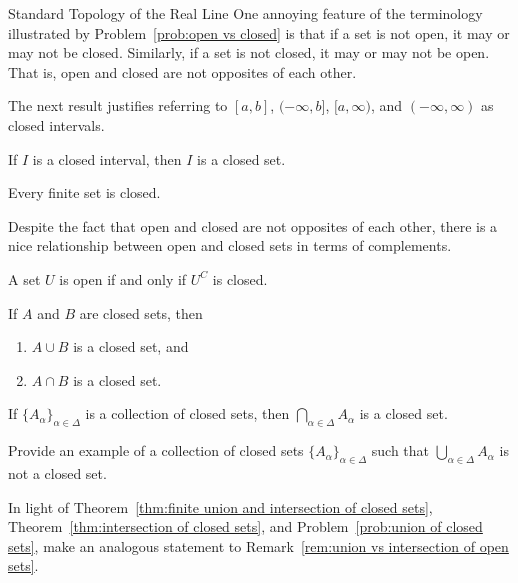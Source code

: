 \begin{section}{Standard Topology of the Real Line}
One annoying feature of the terminology illustrated by Problem~\ref{prob:open vs closed} is that if a set is not open, it may or may not be closed.  Similarly, if a set is not closed, it may or may not be open.  That is, open and closed are not opposites of each other.

The next result justifies referring to $[a,b]$, $(-\infty,b]$, $[a,\infty)$, and $(-\infty,\infty)$ as closed intervals.

\begin{theorem}
If $I$ is a closed interval, then $I$ is a closed set.
\end{theorem}

\begin{theorem}
Every finite set is closed.
\end{theorem}

Despite the fact that open and closed are not opposites of each other, there is a nice relationship between open and closed sets in terms of complements.

\begin{theorem}
A set $U$ is open if and only if $U^C$ is closed.
\end{theorem}

\begin{theorem}\label{thm:finite union and intersection of closed sets}
If $A$ and $B$ are closed sets, then 
\begin{enumerate}[label=\textrm{(\alph*)}]
\item $A\cup B$ is a closed set, and
\item $A\cap B$ is a closed set.
\end{enumerate}
\end{theorem}

\begin{theorem}\label{thm:intersection of closed sets}
If $\{A_{\alpha}\}_{\alpha\in\Delta}$ is a collection of closed sets, then $\bigcap_{\alpha\in \Delta} A_{\alpha}$ is a closed set.
\end{theorem}

\begin{problem}\label{prob:union of closed sets}
Provide an example of a collection of closed sets $\{A_{\alpha}\}_{\alpha\in\Delta}$ such that $\bigcup_{\alpha\in \Delta} A_{\alpha}$ is not a closed set.
\end{problem}

\begin{problem}
In light of Theorem~\ref{thm:finite union and intersection of closed sets}, Theorem~\ref{thm:intersection of closed sets}, and Problem~\ref{prob:union of closed sets}, make an analogous statement to Remark~\ref{rem:union vs intersection of open sets}.
\end{problem}


\end{section}
